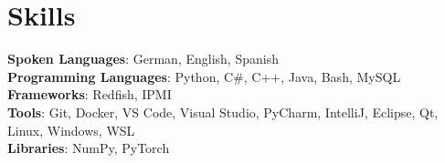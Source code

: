 \documentclass[letterpaper,11pt]{article}
\begin{document}
%
\section{Skills}
 \begin{itemize}[leftmargin=0.15in, label={}]
    \small{\item{
     \textbf{Spoken Languages}{: German, English, Spanish } \\
     \textbf{Programming Languages}{: Python, C\#, C++, Java, Bash, MySQL } \\
     \textbf{Frameworks}{: Redfish, IPMI} \\
     \textbf{Tools}{: Git, Docker, VS Code, Visual Studio, PyCharm, IntelliJ, Eclipse, Qt, Linux, Windows, WSL} \\
     \textbf{Libraries}{: NumPy, PyTorch}
    }}
 \end{itemize}


\end{document}
